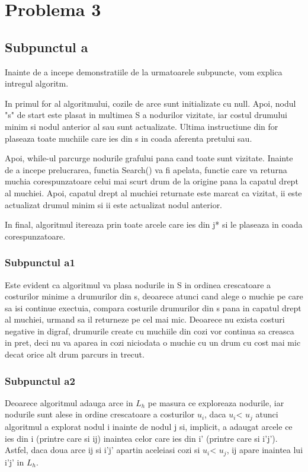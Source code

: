 \documentclass{article}
\begin{document}
\section*{\fontsize{20}{50}\selectfont Problema 3}
\subsection*{\fontsize{16}{30}\selectfont Subpunctul a}
{\fontsize{14}{16}\selectfont
Inainte de a incepe demonstratiile de la urmatoarele subpuncte, vom explica intregul algoritm.

In primul for al algoritmului, cozile de arce sunt initializate cu null.
Apoi, nodul "s" de start este plasat in multimea S a nodurilor vizitate, iar costul drumului minim si nodul anterior al sau sunt actualizate. Ultima instructiune din for plaseaza toate muchiile care ies din s in coada aferenta pretului sau.

Apoi, while-ul parcurge nodurile grafului pana cand toate sunt vizitate. Inainte de a incepe prelucrarea, functia Search() va fi apelata, functie care va returna muchia corespunzatoare celui mai scurt drum de la origine pana la capatul drept al muchiei. Apoi, capatul drept al muchiei returnate este marcat ca vizitat, ii este actualizat drumul minim si ii este actualizat nodul anterior. 

In final, algoritmul itereaza prin toate arcele care ies din j* si le plaseaza in coada corespunzatoare.
}
\subsubsection*{\fontsize{14}{20}\selectfont Subpunctul a1}
{\fontsize{14}{16}\selectfont
Este evident ca algoritmul va plasa nodurile in S in ordinea crescatoare a costurilor minime a drumurilor din s, deoarece atunci cand alege o muchie pe care sa isi continue exectuia, compara costurile drumurilor din s pana in capatul drept al muchiei, urmand sa il returneze pe cel mai mic. Deoarece nu exista costuri negative in digraf, drumurile create cu muchiile din cozi vor continua sa creasca in pret, deci nu va aparea in cozi niciodata o muchie cu un drum cu cost mai mic decat orice alt drum parcurs in trecut.
}

\subsubsection*{\fontsize{14}{20}\selectfont Subpunctul a2}
{\fontsize{14}{16}\selectfont

Deoarece algoritmul adauga arce in $L_h$ pe masura ce exploreaza nodurile, iar nodurile sunt alese in ordine crescatoare a costurilor $u_i$, daca $u_i$< $u_j$ atunci algoritmul a explorat nodul i inainte de nodul j si, implicit, a adaugat arcele ce ies din i (printre care si ij) inaintea celor care ies din i' (printre care si i'j'). Astfel, daca doua arce ij si i'j' apartin aceleiasi cozi si $u_i$< $u_j$, ij apare inaintea lui i'j' in $L_h$.

}
\end{document}
